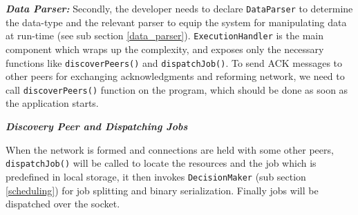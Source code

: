 \documentclass{sig-alternate}[10pt]
\begin{document}
\textbf{\emph{Data Parser:}}
Secondly, the developer needs to declare \texttt{DataParser} to determine the data-type and the relevant parser to equip the system for manipulating data at run-time (see sub section \ref{data_parser}). \texttt{ExecutionHandler} is the main component which wraps up the complexity, and exposes only the necessary functions like \texttt{discoverPeers()} and \texttt{dispatchJob()}. To send ACK messages to other peers for exchanging acknowledgments and reforming network, we need to call \texttt{discoverPeers()} function on the program, which should be done as soon as the application starts.

\begin{figure}
\noindent {}	
  \label{code:get_single_part}

\end{figure}

\textbf{\emph{Discovery Peer and Dispatching Jobs}}

When the network is formed and connections are held with some other peers, \texttt{dispatchJob()} will be called to locate the resources and the job which is predefined in local storage, it then invokes \texttt{DecisionMaker} (sub section \ref{scheduling}) for job splitting and binary serialization. Finally jobs will be dispatched over the socket.

\begin{figure}
\noindent {}

\end{figure}
\end{document}

